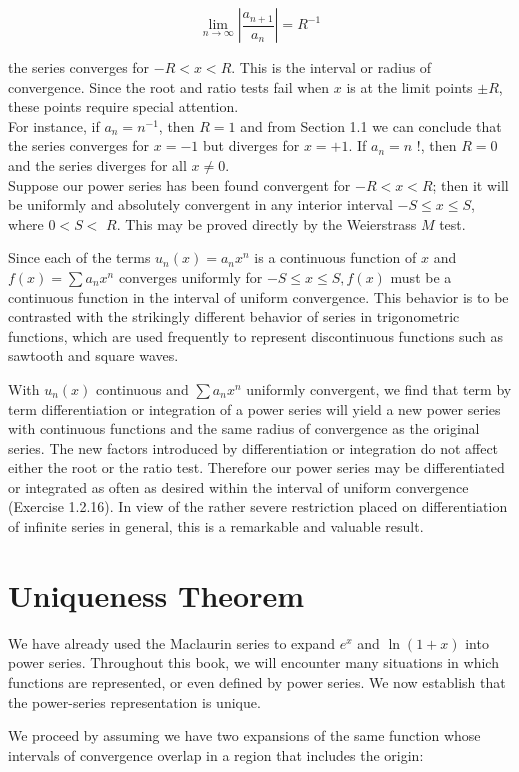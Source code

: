 \documentclass[10pt]{article}
\begin{document}
$$
\lim _{n \rightarrow \infty}\left|\frac{a_{n+1}}{a_{n}}\right|=R^{-1}
$$

the series converges for $-R<x<R$. This is the interval or radius of convergence. Since the root and ratio tests fail when $x$ is at the limit points $\pm R$, these points require special attention.\\
For instance, if $a_{n}=n^{-1}$, then $R=1$ and from Section 1.1 we can conclude that the series converges for $x=-1$ but diverges for $x=+1$. If $a_{n}=n$ !, then $R=0$ and the series diverges for all $x \neq 0$.\\
Suppose our power series has been found convergent for $-R<x<R$; then it will be uniformly and absolutely convergent in any interior interval $-S \leq x \leq S$, where $0<S<$ $R$. This may be proved directly by the Weierstrass $M$ test.

Since each of the terms $u_{n}(x)=a_{n} x^{n}$ is a continuous function of $x$ and $f(x)=\sum a_{n} x^{n}$ converges uniformly for $-S \leq x \leq S, f(x)$ must be a continuous function in the interval of uniform convergence. This behavior is to be contrasted with the strikingly different behavior of series in trigonometric functions, which are used frequently to represent discontinuous functions such as sawtooth and square waves.

With $u_{n}(x)$ continuous and $\sum a_{n} x^{n}$ uniformly convergent, we find that term by term differentiation or integration of a power series will yield a new power series with continuous functions and the same radius of convergence as the original series. The new factors introduced by differentiation or integration do not affect either the root or the ratio test. Therefore our power series may be differentiated or integrated as often as desired within the interval of uniform convergence (Exercise 1.2.16). In view of the rather severe restriction placed on differentiation of infinite series in general, this is a remarkable and valuable result.

\section*{Uniqueness Theorem}
We have already used the Maclaurin series to expand $e^{x}$ and $\ln (1+x)$ into power series. Throughout this book, we will encounter many situations in which functions are represented, or even defined by power series. We now establish that the power-series representation is unique.

We proceed by assuming we have two expansions of the same function whose intervals of convergence overlap in a region that includes the origin:
\end{document}
